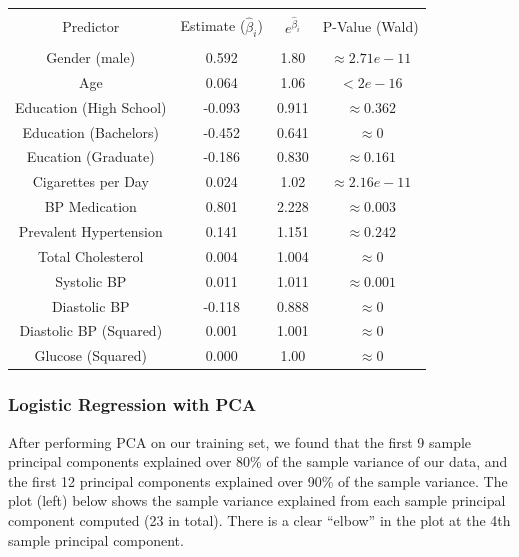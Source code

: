 \documentclass[10pt]{article}
\begin{document}
\begin{table}[h!]
\centering
\begin{tabular}{| c | c | c | c | } 
\hline
&  &  &  \\ 
Predictor & Estimate ($\hat{\beta}_i$) & $e^{\hat{\beta}_i}$ & P-Value (Wald) \\
&  &  &  \\ 
\hline
\hline
Gender (male) & 0.592 & 1.80 & $\approx 2.71e-11$\\
\hline
Age & 0.064 & 1.06 & $< 2e-16$\\
\hline  
Education (High School) &  -0.093  & 0.911  & $\approx 0.362$\\
\hline    
Education (Bachelors) &  -0.452 & 0.641 &  $\approx 0$\\
\hline
Eucation (Graduate) & -0.186 &  0.830 & $\approx 0.161$\\ 
\hline
Cigarettes per Day &  0.024 &  1.02 & $\approx 2.16e-11$\\ 
\hline
BP Medication  & 0.801 &  2.228 & $\approx 0.003$\\
\hline
Prevalent Hypertension & 0.141 & 1.151 & $\approx 0.242$\\  
\hline 
Total Cholesterol & 0.004 & 1.004 & $\approx 0$\\
\hline
Systolic BP & 0.011 & 1.011 & $\approx 0.001$\\
\hline
Diastolic BP & -0.118 &  0.888 & $\approx 0$\\
\hline
Diastolic BP (Squared) & 0.001 & 1.001 & $\approx 0$\\
\hline 
Glucose (Squared) & 0.000 & 1.00 & $\approx 0$\\
\hline 
\end{tabular}
\end{table}


\subsubsection*{Logistic Regression with PCA}

After performing PCA on our training set, we found that the first 9 sample principal components explained over 80\% of the sample variance of our data, and the first 12 principal components explained over 90\% of the sample variance. The plot (left) below shows the sample variance explained from each sample principal component computed (23 in total). There is a clear “elbow” in the plot at the 4th sample principal component.
\end{document}
